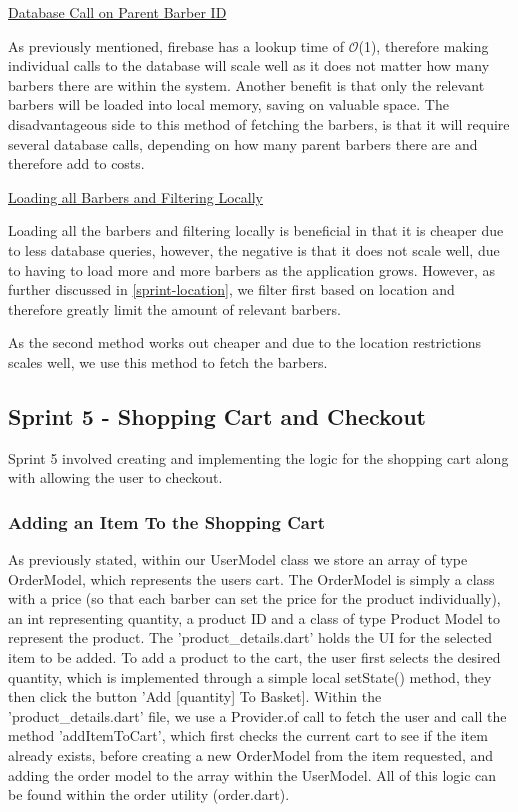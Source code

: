 \documentclass[12pt]{article}
\begin{document}
	\noindent
	\underline{Database Call on Parent Barber ID}
	\newline
	
	\noindent
	As previously mentioned, firebase has a lookup time of $\mathcal{O}$(1), therefore making individual calls to the database will scale well as it does not matter how many barbers there are within the system. Another benefit is that only the relevant barbers will be loaded into local memory, saving on valuable space. The disadvantageous side to this method of fetching the barbers, is that it will require several database calls, depending on how many parent barbers there are and therefore add to costs.
	\newline
	
	\noindent	
	\underline{Loading all Barbers and Filtering Locally}
	\newline
	
	\noindent
	Loading all the barbers and filtering locally is beneficial in that it is cheaper due to less database queries, however, the negative is that it does not scale well, due to having to load more and more barbers as the application grows. However, as further discussed in \autoref{sprint-location}, we filter first based on location and therefore greatly limit the amount of relevant barbers.
	
	As the second method works out cheaper and due to the location restrictions scales well, we use this method to fetch the barbers.
	
	\subsection{Sprint 5 - Shopping Cart and Checkout}
	Sprint 5 involved creating and implementing the logic for the shopping cart along with allowing the user to checkout.
	
	\subsubsection{Adding an Item To the Shopping Cart}
	As previously stated, within our UserModel class we store an array of type OrderModel, which represents the users cart. The OrderModel is simply a class with a price (so that each barber can set the price for the product individually), an int representing quantity, a product ID and a class of type Product Model to represent the product. The 'product\_details.dart' holds the UI for the selected item to be added. To add a product to the cart, the user first selects the desired quantity, which is implemented through a simple local setState() method, they then click the button 'Add [quantity] To Basket]. Within the 'product\_details.dart' file, we use a Provider.of call to fetch the user and call the method 'addItemToCart', which first checks the current cart to see if the item already exists, before creating a new OrderModel from the item requested, and adding the order model to the array within the UserModel. All of this logic can be found within the order utility (order.dart).
	
\end{document}
